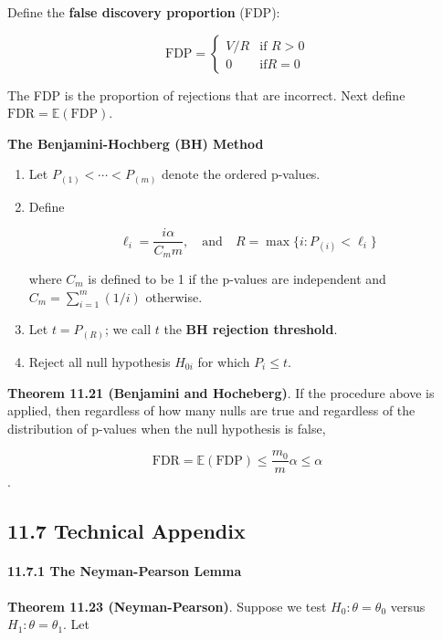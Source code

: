 Define the \textbf{false discovery proportion} (FDP):

\[ \text{FDP} = \begin{cases}
V / R & \text{if } R > 0\\
0     & \text{if}  R = 0
\end{cases}\]

The FDP is the proportion of rejections that are incorrect. Next define
\(\text{FDR} = \mathbb{E}(\text{FDP})\).

\textbf{The Benjamini-Hochberg (BH) Method}

\begin{enumerate}[label={\arabic*.}]
\item
  Let \(P_{(1)} < \cdots < P_{(m)}\) denote the ordered p-values.
\item
  Define

\[\ell_{i} = \frac{i \alpha}{C_m m},
\quad \text{and} \quad
R = \max \bigg\{ i: P_{(i)} < \ell_{i} \bigg\}\]

where \(C_m\) is defined to be 1 if the p-values are independent and
\(C_m = \sum_{i=1}^m (1/i)\) otherwise.
\end{enumerate}

\begin{enumerate}[label={\arabic*.}]
\setcounter{enumi}{2}
\item
  Let \(t = P_{(R)}\); we call \(t\) the \textbf{BH rejection
  threshold}.
\item
  Reject all null hypothesis \(H_{0i}\) for which \(P_{i} \leq t\).
\end{enumerate}

\textbf{Theorem 11.21 (Benjamini and Hocheberg)}. If the procedure above
is applied, then regardless of how many nulls are true and regardless of
the distribution of p-values when the null hypothesis is false,

\[\text{FDR} = \mathbb{E}(\text{FDP}) \leq \frac{m_{0}}{m} \alpha \leq \alpha \].

\subsection*{11.7 Technical Appendix}

\paragraph{11.7.1 The Neyman-Pearson
Lemma}\label{the-neyman-pearson-lemma}

\textbf{Theorem 11.23 (Neyman-Pearson)}. Suppose we test
\(H_{0}: \theta = \theta_{0}\) versus \(H_{1}: \theta = \theta_{1}\). Let

